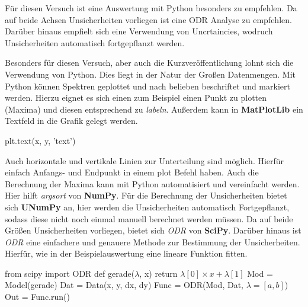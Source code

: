 \documentclass[a4paper,12pt]{article}
\begin{document}
\begin{center}
\begin{tcolorbox}[colback=gray!20, colframe=red, width=0.8\textwidth, boxrule=1pt, arc=1mm]
Für diesen Versuch ist eine Auswertung mit Python besonders zu empfehlen. \newline
Da auf beide Achsen Unsicherheiten vorliegen ist eine ODR Analyse zu empfehlen. Darüber hinaus empfielt sich eine Verwendung von Uncrtaincies, wodruch Unsicherheiten automatisch fortgepflanzt werden.
\end{tcolorbox}
\end{center} 
\noindent
Besonders für diesen Versuch, aber auch die Kurzveröffentlichung lohnt sich die Verwendung von Python. Dies liegt in der Natur der Großen Datenmengen. Mit Python können Spektren geplottet und nach belieben beschriftet und markiert werden. Hierzu eignet es sich einen zum Beispiel einen Punkt zu plotten (Maxima) und diesen entsprechend zu \textit{labeln}. Außerdem kann in \textbf{MatPlotLib} ein Textfeld in die Grafik gelegt werden.
\begin{center}
\begin{tcolorbox}[colback=gray!20, colframe=black, width=1\textwidth, boxrule=1pt, arc=1mm]
plt.text(x, y, 'text')
\end{tcolorbox}
\end{center}
Auch horizontale und vertikale Linien zur Unterteilung sind möglich. Hierfür einfach Anfangs- und Endpunkt in einem plot Befehl haben.
Auch die Berechnung der Maxima kann mit Python automatisiert und vereinfacht werden. Hier hilft \textit{argsort} von \textbf{NumPy}. \newline 
Für die Berechnung der Unsicherheiten bietet sich \textbf{UNumPy} an, hier werden die Unsicherheiten automatisch Fortgepflanzt, sodass diese nicht noch einmal manuell berechnet werden müssen. \newline
Da auf beide Größen Unsicherheiten vorliegen, bietet sich \textit{ODR} von \textbf{SciPy}. Darüber hinaus ist \textit{ODR} eine einfachere und genauere Methode zur Bestimmung der Unsicherheiten. Hierfür, wie in der Beispielauswertung eine lineare Funktion fitten. \newline
\begin{center}
\begin{tcolorbox}[colback=gray!20, colframe=black, width=1\textwidth, boxrule=1pt, arc=1mm]
from scipy import ODR \newline
def gerade($\lambda$, x) \newline
\hspace*{1cm} return $\lambda[0] \times x + \lambda[1]$ \newline
Mod = Model(gerade) \newline
Dat = Data(x, y, dx, dy) \newline
Func = ODR(Mod, Dat, $\lambda=[a, b]$) \newline
Out = Func.run()
\end{tcolorbox}
\end{center}
\end{document}
